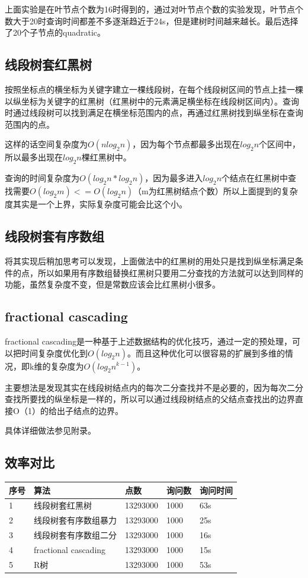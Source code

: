 \documentclass[10pt]{scrartcl}
\begin{document}
上面实验是在叶节点个数为16时得到的，通过对叶节点个数的实验发现，叶节点个数大于20时查询时间都差不多逐渐趋近于24s，但是建树时间越来越长。最后选择了20个子节点的quadratic。

\subsection{线段树套红黑树}
按照坐标点的横坐标为关键字建立一棵线段树，在每个线段树区间的节点上挂一棵以纵坐标为关键字的红黑树（红黑树中的元素满足横坐标在线段树区间内）。查询时通过线段树可以找到满足在横坐标范围内的点，再通过红黑树找到纵坐标在查询范围内的点。

这样的话空间复杂度为$O(nlog_2n)$，因为每个节点都最多出现在$log_2n$个区间中，所以最多出现在$log_2n$棵红黑树中。

查询的时间复杂度为$O(log_2n*log_2n)$，因为最多进入$log_2n$个结点在红黑树中查找需要$O(log_2m) <= O(log_2n)$（m为红黑树结点个数）所以上面提到的复杂度其实是一个上界，实际复杂度可能会比这个小。

\subsection{线段树套有序数组}
将其实现后稍加思考可以发现，上面做法中的红黑树的用处只是找到纵坐标满足条件的点，所以如果用有序数组替换红黑树只要用二分查找的方法就可以达到同样的功能，虽然复杂度不变，但是常数应该会比红黑树小很多。

\subsection{fractional cascading}
fractional cascading\cite{ wiki:xxx}是一种基于上述数据结构的优化技巧，通过一定的预处理，可以把时间复杂度优化到$O(log_2n)$。而且这种优化可以很容易的扩展到多维的情况，即k维的复杂度为$O(log_2n^{k-1})$。

主要想法是发现其实在线段树结点内的每次二分查找并不是必要的，因为每次二分查找所要找的纵坐标是一样的，所以可以通过线段树结点的父结点查找出的边界直接O（1）的给出子结点的边界。

具体详细做法参见附录。

\subsection{效率对比}
\begin{tabular}{|l|l|l|l|l|}
\hline
序号 & 算法 & 点数 & 询问数 & 询问时间 \\
\hline
1   & 线段树套红黑树 & 13293000 & 1000 & 63s \\
\hline
2   & 线段树套有序数组暴力 & 13293000 & 1000 & 25s \\
\hline
3   & 线段树套有序数组二分 & 13293000 & 1000 & 16s \\
\hline
4   & fractional cascading & 13293000 & 1000 & 15s \\
\hline
5   & R树 & 13293000 & 1000 & 53s \\
\hline
\end{tabular}
\end{document}
